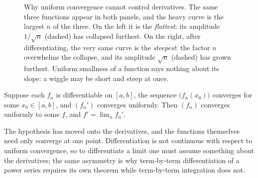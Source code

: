 \begin{figure}[htbp]
\centering
{}
\caption{Why uniform convergence cannot control derivatives. The same three
functions appear in both panels, and the heavy curve is the largest $n$ of
the three. On the left it is the \emph{flattest}: its amplitude $1/\sqrt n$
(dashed) has collapsed furthest. On the right, after differentiating, the
very same curve is the \emph{steepest}: the factor $n$ overwhelms the
collapse, and its amplitude $\sqrt n$ (dashed) has grown furthest. Uniform
smallness of a function says nothing about its slope: a wiggle may be short
and steep at once.}
\label{fig:wiggle}
\end{figure}

\begin{theorem}[Rudin 7.17]\label{thm:repair}
Suppose each $f_n$ is differentiable on $[a,b]$, the sequence
$\bigl(f_n(x_0)\bigr)$ converges for some $x_0\in[a,b]$, and $(f_n')$
converges uniformly. Then $(f_n)$ converges uniformly to some $f$, and
$f'=\lim_n f_n'$.
\end{theorem}

The hypothesis has moved onto the derivatives, and the functions themselves
need only converge at one point. Differentiation is not continuous with
respect to uniform convergence, so to differentiate a limit one must assume
something about the derivatives; the same asymmetry is why term-by-term
differentiation of a power series requires its own theorem while term-by-term
integration does not.

